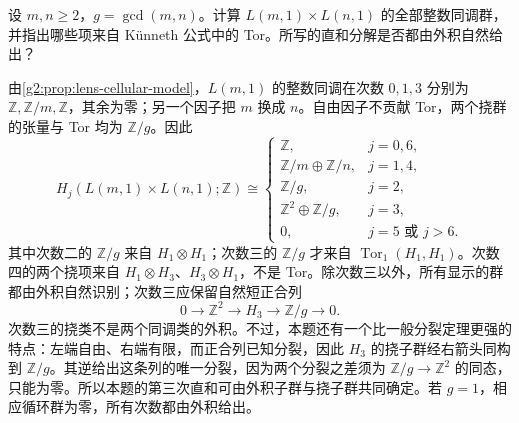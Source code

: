 \begin{exercise}\label{g2:ex:lens-product-groups}
	设 \(m,n\ge2\)，\(g=\gcd(m,n)\)。计算 \(L(m,1)\times L(n,1)\) 的全部整数同调群，并指出哪些项来自 Künneth 公式中的 Tor。所写的直和分解是否都由外积自然给出？
\end{exercise}
\begin{solution}
	由\cref{g2:prop:lens-cellular-model}，\(L(m,1)\) 的整数同调在次数 \(0,1,3\) 分别为 \(\mathbb Z,\mathbb Z/m,\mathbb Z\)，其余为零；另一个因子把 \(m\) 换成 \(n\)。自由因子不贡献 Tor，两个挠群的张量与 Tor 均为 \(\mathbb Z/g\)。因此
	\[
		H_j(L(m,1)\times L(n,1);\mathbb Z)\cong
		\begin{cases}
			\mathbb Z,&j=0,6,\\
			\mathbb Z/m\oplus\mathbb Z/n,&j=1,4,\\
			\mathbb Z/g,&j=2,\\
			\mathbb Z^2\oplus\mathbb Z/g,&j=3,\\
			0,&j=5\text{ 或 }j>6.
		\end{cases}
	\]
	其中次数二的 \(\mathbb Z/g\) 来自 \(H_1\otimes H_1\)；次数三的 \(\mathbb Z/g\) 才来自 \(\operatorname{Tor}_1(H_1,H_1)\)。次数四的两个挠项来自 \(H_1\otimes H_3\)、\(H_3\otimes H_1\)，不是 Tor。除次数三以外，所有显示的群都由外积自然识别；次数三应保留自然短正合列
	\[
		0\longrightarrow\mathbb Z^2\longrightarrow H_3
		\longrightarrow\mathbb Z/g\longrightarrow0.
	\]
	次数三的挠类不是两个同调类的外积。不过，本题还有一个比一般分裂定理更强的特点：左端自由、右端有限，而正合列已知分裂，因此 \(H_3\) 的挠子群经右箭头同构到 \(\mathbb Z/g\)。其逆给出这条列的唯一分裂，因为两个分裂之差须为 \(\mathbb Z/g\to\mathbb Z^2\) 的同态，只能为零。所以本题的第三次直和可由外积子群与挠子群共同确定。若 \(g=1\)，相应循环群为零，所有次数都由外积给出。
\end{solution}

